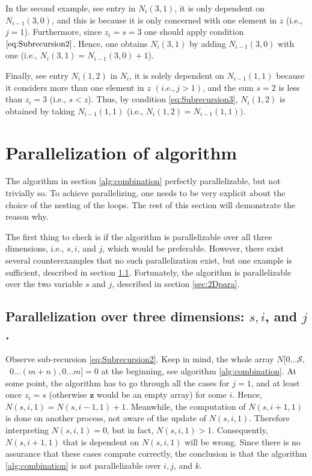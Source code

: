 \documentclass[a4paper,11pt]{article}
\begin{document}
In the second example, see entry  in $N_{i}(3,1)$, it is only dependent on $N_{i-1}(3,0)$, and this is because it is only concerned with one element in $z$ (i.e., $j=1$). Furthermore, since $z_{i}=s=3$ one should apply condition $\ref{eq:Subrecursion2}$. Hence, one obtains $N_{i}(3,1)$ by adding $N_{i-1}(3,0)$ with one (i.e., $N_{i}(3,1)=N_{i-1}(3,0)+1$).

Finally, see entry $N_{i}(1,2)$ in $N_{i}$, it is solely dependent on $N_{i-1}(1,1)$ because it considers more than one element in $z$ $(i.e., j>1)$, and the sum $s=2$ is less than $z_{i}=3$ (i.e., $s<z$). Thus, by condition \ref{eq:Subrecursion3},  $N_{i}(1,2)$ is obtained by taking $N_{i-1}(1,1)$ (i.e., $N_{i}(1,2)=N_{i-1}(1,1)).$

\section{Parallelization of algorithm}
\label{sec:paraAlgo}
The algorithm in section \ref{alg:combination} perfectly parallelizable, but not trivially so. To achieve parallelizing, one needs to be very explicit about the choice of the nesting of the loops. The rest of this section will demonstrate the reason why.

The first thing to check is if the algorithm is parallelizable over all three dimensions, i.e., $s, i$, and $j$, which would be preferable. However, there exist several counterexamples that no such parallelization exist, but one example is sufficient, described in section \ref{sec:3Dpara}. Fortunately, the algorithm is parallelizable over the two variable $s$ and $j$, described in section \ref{sec:2Dpara}.

\subsection{Parallelization over three dimensions: $s, i$, and $j$.}
\label{sec:3Dpara}
Observe sub-recursion \ref{eq:Subrecursion2}. Keep in mind, the whole array $N[0\ldots \mathcal{S},$\ $0\ldots(m+n),0\ldots m]=0$ at the beginning, see algorithm \ref{alg:combination}.  At some point, the algorithm has to go through all the cases for $j=1$, and at least once $z_{i}=s$ (otherwise $\bm{z}$ would be an empty array) for some $i$. Hence, $N(s,i,1) = N(s,i-1,1)+1$. Meanwhile, the computation of $N(s,i+1,1)$ is done on another process, not aware of the update of $N(s,i,1)$. Therefore interpreting $N(s,i,1)=0$, but in fact, $N(s,i,1)>1$. Consequently, $N(s,i+1,1)$ that is dependent on $N(s,i,1)$ will be wrong. Since there is no assurance that these cases compute correctly, the conclusion is that the algorithm \ref{alg:combination} is not parallelizable over $i,j$, and $k$.
\end{document}
